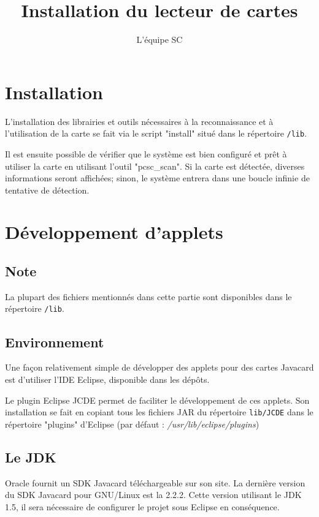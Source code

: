 \documentclass[a4paper,11pt,french]{article}
\title{Installation du lecteur de cartes}
\author{L'équipe SC}
\begin{document}
\maketitle

\section{Installation}
L'installation des librairies et outils nécessaires à la reconnaissance et
à l'utilisation de la carte se fait via le script "install" situé 
dans le répertoire \texttt{/lib}.

Il est ensuite possible de vérifier que le système est bien configuré et prêt
à utiliser la carte en utilisant l'outil "pcsc\_scan". Si la carte est détectée,
diverses informations seront affichées; sinon, le système entrera dans une boucle
infinie de tentative de détection.

\section{Développement d'applets}

\subsection{Note}
La plupart des fichiers mentionnés dans cette partie sont disponibles dans le 
répertoire \texttt{/lib}.

\subsection{Environnement}
Une façon relativement simple de développer des applets pour des cartes
Javacard est d'utiliser l'IDE Eclipse, disponible dans les dépôts. 

Le plugin Eclipse JCDE permet de faciliter le développement de ces applets. 
Son installation se fait en copiant tous les fichiers JAR du répertoire \texttt{lib/JCDE}
dans le répertoire "plugins" d'Eclipse (par défaut : \emph{/usr/lib/eclipse/plugins})


\subsection{Le JDK}
Oracle fournit un SDK Javacard téléchargeable sur son site.
La dernière version du SDK Javacard pour GNU/Linux est la 2.2.2. Cette version 
utilisant le JDK 1.5, il sera nécessaire de configurer le projet sous Eclipse en
conséquence.
\end{document}
